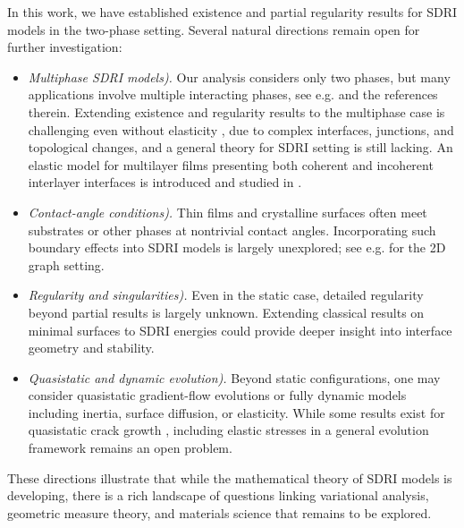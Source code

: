 \documentclass[reqno]{amsart}
\numberwithin{equation}{section}
\theoremstyle{plain}
\theoremstyle{definition}
\begin{document}
In this work, we have established existence and partial regularity results for SDRI models in the two-phase setting. Several natural directions remain open for further investigation:
%
\begin{itemize}[left=5pt]
\item[] {\it Multiphase SDRI models).}
Our analysis considers only two phases, but many applications involve
multiple interacting phases, see e.g. \cite{FPS:2021,LP:2025} and the references therein. Extending existence and regularity results to the multiphase case is challenging even without elasticity \cite[Chapter 30]{Maggi:2012}, due to complex interfaces, junctions, and topological changes, and a general theory for SDRI setting is still lacking. An elastic model for multilayer films presenting both coherent and incoherent interlayer interfaces is introduced and studied in \cite{LP:2025}.
\medskip

\item[] {\it Contact-angle conditions).}
Thin films and crystalline surfaces often meet substrates or other phases at nontrivial contact angles. Incorporating such boundary effects into SDRI models is largely unexplored; see e.g. \cite{DP:2018_1,DP:2018_2} for the 2D graph setting.
\medskip

\item[] {\it Regularity and singularities).}
Even in the static case, detailed regularity beyond partial results is largely unknown. Extending classical results on minimal surfaces to SDRI energies could provide deeper insight into interface geometry and stability.
\medskip

\item[] {\it Quasistatic and dynamic evolution).} Beyond static configurations, one may consider quasistatic gradient-flow evolutions or fully dynamic models including inertia, surface diffusion, or elasticity. While some results exist for quasistatic crack growth \cite{DFT:2005,DT:2002,FL:2003,FS:2018}, including elastic stresses in a general evolution framework remains an open problem.

\end{itemize}
%
These directions illustrate that while the mathematical theory of SDRI models is developing, there is a rich landscape of questions linking variational analysis, geometric measure theory, and materials science that remains to be explored.
\end{document}
